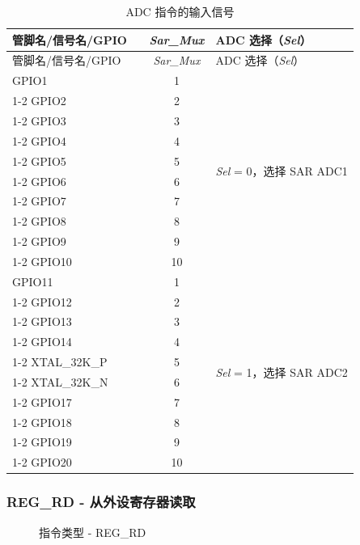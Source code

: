 \documentclass[main\_\_CN.tex]{subfiles}
\begin{document}
\clearpage
\begin{longtable}{ |p{3.5cm}|c|p{4cm}| }
    \caption{ADC 指令的输入信号}
    \label{tab:adc-inputs1}
    \\\hline
    \rowcolor{lightgray}
    管脚名/信号名/GPIO \ & \textit{Sar\_Mux} & ADC 选择（\textit{Sel}） \\\hline
    \endfirsthead
    \hline
    \rowcolor{lightgray}
    管脚名/信号名/GPIO \ & \textit{Sar\_Mux} & ADC 选择（\textit{Sel}） \\\hline
    \endhead
    \hline
    \endfoot
    GPIO1    &  1  & \multirow{10}{*}{\textit{Sel} = 0，选择 SAR ADC1} \\ \cline{1-2}
    GPIO2  &  2  & \\ \cline{1-2}
    GPIO3  &  3  & \\ \cline{1-2}
    GPIO4  &  4  & \\ \cline{1-2}
    GPIO5  &  5  & \\ \cline{1-2}
    GPIO6  &  6  & \\ \cline{1-2}
    GPIO7  &  7  & \\ \cline{1-2}
    GPIO8  &  8  & \\ \cline{1-2}
    GPIO9  &  9  & \\ \cline{1-2}
    GPIO10  &  10  & \\ \hline
    GPIO11  &  1  & \multirow{10}{*}{\textit{Sel} = 1，选择 SAR ADC2 } \\ \cline{1-2}
    GPIO12  &  2  & \\ \cline{1-2}
    GPIO13  &  3  & \\ \cline{1-2}
    GPIO14  &  4  & \\ \cline{1-2}
    XTAL\_32K\_P  &  5  & \\ \cline{1-2}
    XTAL\_32K\_N  &  6  & \\ \cline{1-2}
    GPIO17  &  7  & \\ \cline{1-2}
    GPIO18  &  8  & \\ \cline{1-2}
    GPIO19  &  9  & \\ \cline{1-2}
    GPIO20                 &  10  &
\end{longtable}
\subsubsection{REG\_RD - 从外设寄存器读取} \label{sec:REG-RD}

%
%
%
%
%
\begin{figure}[H]
    \centering
    \caption{指令类型 - REG\_RD}
    \label{fig:REG-RD}
\end{figure}
\end{document}
